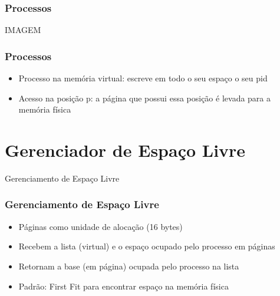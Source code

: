 \documentclass{beamer}
\begin{document}
\begin{frame}
\frametitle{Processos}
IMAGEM
\justifying
\end{frame}

\begin{frame}
\frametitle{Processos}
\begin{itemize}
\item Processo na memória virtual: escreve em todo o seu espaço o seu pid

\item Acesso na posição p: a página que possui essa posição é levada para a memória física
\end{itemize}
\justifying
\end{frame}


\section{Gerenciador de Espaço Livre} 
\begin{frame}
\begin{Large}
\begin{center}
Gerenciamento de Espaço Livre
\end{center}
\end{Large}
\end{frame}

\begin{frame}
\frametitle{Gerenciamento de Espaço Livre}
\begin{itemize}

\item Páginas como unidade de alocação (16 bytes)  

\item Recebem a lista (virtual) e o espaço ocupado pelo processo em páginas

\item Retornam a base (em página) ocupada pelo processo na lista

\item Padrão: First Fit para encontrar espaço na memória física

\end{itemize}
\end{frame}
\end{document}
